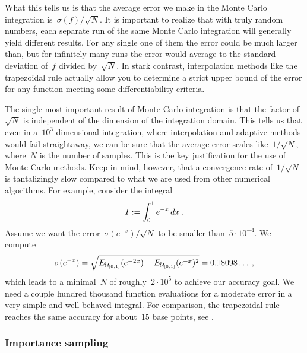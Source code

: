 What this tells us is that the average error we make in the Monte Carlo
integration is~$\sigma(f)/\sqrt{N}$. It is important to realize that with truly
random numbers, each separate run of the same Monte Carlo integration will
generally yield different results. For any single one of them the error could be
much larger than, but for infinitely many runs the error would average to the
standard deviation of~$f$ divided by~$\sqrt{N}$. In stark contrast,
interpolation methods like the trapezoidal rule actually allow you to determine
a strict upper bound of the error for any function meeting some
differentiability criteria.

The single most important result of Monte Carlo integration is that the factor
of~$\sqrt{N}$ is independent of the dimension of the integration domain. This
tells us that even in a~$10^3$ dimensional integration, where interpolation and
adaptive methods would fail straightaway, we can be sure that the average error
scales like~$1/\sqrt{N}$, where~$N$ is the number of samples. This is the key
justification for the use of Monte Carlo methods. Keep in mind, however, that a
convergence rate of~$1/\sqrt{N}$ is tantalizingly slow compared to what we are
used from other numerical algorithms. For example, consider the integral
%
\begin{equation}
  I := \int_0^1 e^{-x} \,dx\:.
\end{equation}
%
Assume we want the error~$\sigma (e^{-x}) / \sqrt{N}$ to be smaller
than~$5 \cdot 10^{-4}$. We compute
%
\begin{equation}\label{sigmaexp}
  \sigma (e^{-x}) =
    \sqrt{E_{\mathcal{U}_{[0,1]}}(e^{-2 x}) - E_{\mathcal{U}_{[0,1]}}(e^{-x})^2} =
    0.18098\ldots \:,
\end{equation}
%
which leads to a minimal~$N$ of roughly~$2\cdot10^5$ to achieve our accuracy
goal. We need a couple hundred thousand function evaluations for a moderate
error in a very simple and well behaved integral. For comparison, the
trapezoidal rule reaches the same accuracy for about~$15$ base points, see
.

\subsubsection{Importance sampling}

